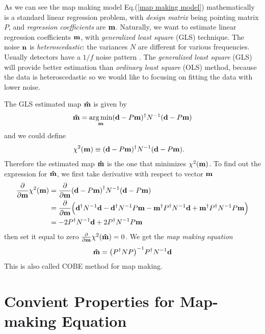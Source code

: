 \documentclass[11pt, letterpaper]{article}
\DeclareMathOperator*{\argmin}{arg\,min}
\newcommand{\vbd}{\vb{d}}
\newcommand{\vbm}{\vb{m}}
\newcommand{\vbn}{\vb{n}}
\newcommand{\inv}[1]{#1^{-1}}
\newcommand{\hatm}{\vb{\hat{m}}}
\newcommand{\Pdagger}{P^{\dagger}}
\newcommand{\PPinv}[1]{\inv{\qty(\Pdagger #1 P)}}
\begin{document}
As we can see the map making model Eq.(\ref{map making model}) mathematically 
is a standard linear regression problem,
with \textit{design matrix} being pointing matrix $P$, and \textit{regression
coefficients} are $\vbm$.
Naturally, we want to estimate linear regression coefficients $\vbm$,
with \textit{generalized least square} (GLS) technique.
The noise $\vbn$ is \textit{heteroscedastic}: the variances $N$ are 
different for various frequencies.  Usually detectors have a $1/f$ noise pattern
\cite{1997PhRvD..56.4514T}.
The \textit{generalized least square} (GLS) will provide better estimation 
than \textit{ordinary least square} (OLS) method, because the data is
heteroscedastic so we would like to focusing on fitting the data with lower 
noise.

The GLS estimated map $\hatm$ is given by
\begin{equation}
\hatm = \argmin_{\vbm} (\vbd - P\vbm)^{\dagger} N^{-1} (\vbd - P \vbm) 
\label{GLS estimator equation}
\end{equation}
and we could define 
\begin{align}
\chi^2(\vbm) & \equiv (\vbd - P\vbm)^{\dagger} N^{-1} (\vbd - P \vbm).
\label{chi2 formula}
\end{align}
Therefore the estimated map $\hatm$ is the one that minimizes $\chi^2(\vbm)$.
To find out the expression for $\hatm$, we first take derivative with respect to 
vector $\vbm$
\begin{align}
\begin{aligned}[b]
\pdv{\vbm} \chi^2(\vbm)
&= \pdv{\vbm} (\vbd - P\vbm)^{\dagger} N^{-1} (\vbd - P \vbm)
\\
&= \pdv{\vbm} \qty\Big(
    \vbd^{\dagger} N^{-1} \vbd 
    - \vbd^{\dagger} N^{-1} P \vbm 
    - \vbm^{\dagger}\Pdagger N^{-1}\vbd 
    + \vbm^{\dagger} \Pdagger N^{-1}P\vbm
)
\\
&= -2\Pdagger N^{-1} \vbd + 2 \Pdagger N^{-1} P \vbm
\label{dchi2/dm}
\end{aligned}
\end{align}
then set it equal to zero $\pdv{\vbm} \chi^2(\hatm) = 0$.
We get the \textit{map making equation}
\begin{align}
\hatm = \PPinv{N} \Pdagger \inv{N} \vbd \label{map making equation}
\end{align}
This is also called COBE method for map making.

\section{Convient Properties for Map-making Equation}
\end{document}
